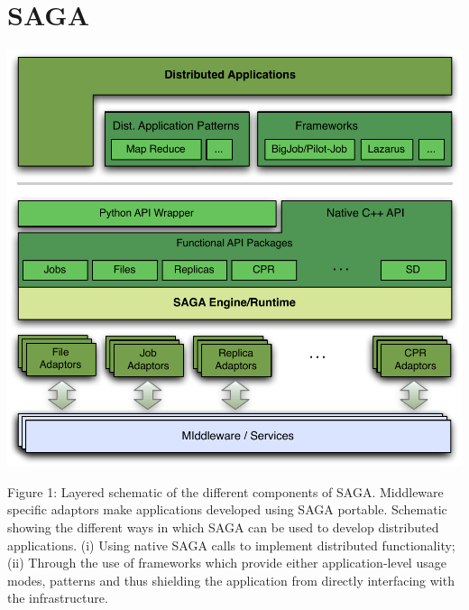 \section {SAGA}

  \includegraphics[width=1.0\textwidth]{./figures/figure_02}
  \caption{\footnotesize Figure 1: Layered schematic of the different
    components of SAGA.  Middleware specific adaptors make
    applications developed using SAGA portable.  Schematic showing
    the different ways in which SAGA can be used to develop
    distributed applications. (i) Using native SAGA calls to
    implement distributed functionality; (ii) Through the use of
    frameworks which provide either application-level usage modes,
    patterns and thus shielding the application from directly
    interfacing with the infrastructure.}
\vspace{-1em}
  \label{sagalayer}

	
	
